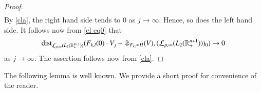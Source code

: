 \documentclass[12pt]{amsart}
\begin{document}
\begin{proof}
\begin{align*}
\end{align*}
By \eqref{cla}, the right hand side tends to $0$ as $j\to\infty.$ Hence, so does the left hand side. It follows now from \eqref{cl eq0} that
$${\rm dist}_{\mathcal{L}_{p,\infty}(L_2(\mathbb{R}^{n+1}_+))}(F_{k,l}(0)\cdot V_j-\mathfrak{S}_{F_{k,l}\circ H}(V),(\mathcal{L}_{p,\infty}(L_2(\mathbb{R}^{n+1}_+)))_0)\to0$$
as $j\to\infty.$ The assertion follows now from \eqref{cla}.
\end{proof}

The following lemma is well known. We provide a short proof for convenience of the reader.
\end{document}
